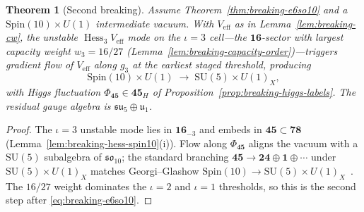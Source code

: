\documentclass[11pt]{article}
\theoremstyle{plain}
\newtheorem{theorem}{Theorem}[section]
\theoremstyle{definition}
\theoremstyle{remark}
\numberwithin{equation}{section}
\newcommand{\Spin}{\mathrm{Spin}}
\newcommand{\Hess}{\operatorname{Hess}}
\begin{document}
\begin{theorem}[Second breaking]\label{thm:breaking-so10su5}
Assume Theorem~\ref{thm:breaking-e6so10} and a $\Spin(10)\times U(1)$
intermediate vacuum. With $V_{\mathrm{eff}}$ as in Lemma~\ref{lem:breaking-cw},
the unstable $\Hess_3 V_{\mathrm{eff}}$ mode on the $\iota=3$ cell---the
$\mathbf{16}$-sector with largest capacity weight $w_3=16/27$
(Lemma~\ref{lem:breaking-capacity-order})---triggers gradient flow of
$V_{\mathrm{eff}}$ along $g_3$ at the earliest staged threshold, producing
\begin{equation}\label{eq:breaking-so10su5}
  \Spin(10)\times U(1)\;\longrightarrow\;\mathrm{SU}(5)\times U(1)_X,
\end{equation}
with Higgs fluctuation $\Phi_{\mathbf{45}}\in\mathbf{45}_H$ of
Proposition~\ref{prop:breaking-higgs-labels}. The residual gauge algebra is
$\mathfrak{su}_5\oplus\mathfrak{u}_1$.
\end{theorem}

\begin{proof}
The $\iota=3$ unstable mode lies in $\mathbf{16}_{-3}$ and embeds in
$\mathbf{45}\subset\mathbf{78}$ (Lemma~\ref{lem:breaking-hess-spin10}(i)).
Flow along $\Phi_{\mathbf{45}}$ aligns the vacuum with a $\mathrm{SU}(5)$
subalgebra of $\mathfrak{so}_{10}$; the standard branching
$\mathbf{45}\to\mathbf{24}\oplus\mathbf{1}\oplus\cdots$ under
$\mathrm{SU}(5)\times U(1)_X$ matches Georgi--Glashow
$\Spin(10)\to\mathrm{SU}(5)\times U(1)_X$~\cite{GeorgiGlashow1974}. The
$16/27$ weight dominates the $\iota=2$ and $\iota=1$ thresholds, so this is
the second step after \eqref{eq:breaking-e6so10}.
\end{proof}
\end{document}
